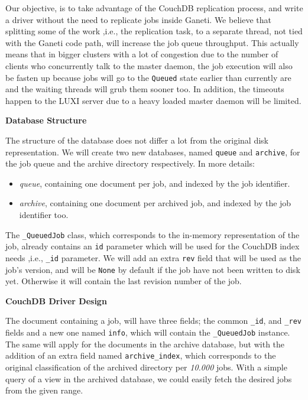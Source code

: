 \begin{description}
    Our objective, is to take advantage of the CouchDB replication process, and
    write a driver without the need to replicate jobs inside Ganeti.
    We believe that splitting some of the work ,i.e., the replication task, to a
    separate thread, not tied with the Ganeti code path, will increase the job
    queue throughput. This actually means that in bigger clusters with a lot of
    congestion due to the number of clients who concurrently talk to the master
    daemon, the job execution will also be fasten up because jobs will go to the
    \texttt{Queued} state earlier than currently are and the waiting threads
    will grub them sooner too. In addition, the timeouts happen to the LUXI
    server due to a heavy loaded master daemon will be limited.

    \textbf{Database Structure}

    The structure of the database does not differ a lot from the original disk
    representation. We will create two new databases, named \texttt{queue} and
    \texttt{archive}, for the job queue and the archive directory respectively.
    In more details:

    \begin{itemize}
      \item \emph{queue}, containing one document per job, and indexed by the
      job identifier.
      \item \emph{archive}, containing one document per archived job, and
      indexed by the job identifier too.
    \end{itemize}

    The \texttt{\_QueuedJob} class, which corresponds to the in-memory
    representation of the job, already contains an \texttt{id} parameter which
    will be used for the CouchDB index needs ,i.e., \texttt{\_id} parameter. We
    will add an extra \texttt{rev} field that will be used as the job's version,
    and will be \texttt{None} by default if the job have not been written
    to disk yet. Otherwise it will contain the last revision number of the job.

    \textbf{CouchDB Driver Design}

    The document containing a job, will have three fields; the common
    \texttt{\_id}, and \texttt{\_rev} fields and a new one named \texttt{info},
    which will contain the \texttt{\_QueuedJob} instance. The same will apply
    for the documents in the archive database, but with the addition of an extra
    field named \texttt{archive\_index}, which corresponds to the original
    classification of the archived directory per \emph{10.000} jobs. With a
    simple query of a view in the archived database, we could easily fetch the
    desired jobs from the given range.


\end{description}
